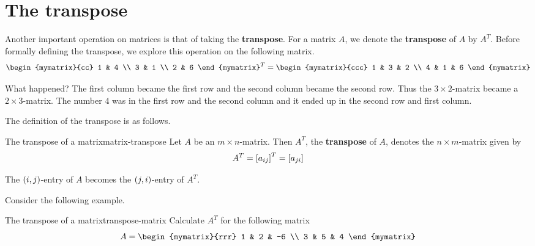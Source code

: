 \section{The transpose}

Another important operation on matrices is that of taking the
\textbf{transpose}. For a matrix $A$, we denote the \textbf{transpose}
of $A$ by $A^T$. Before formally defining the transpose, we explore
this operation on the following matrix.
\begin{equation*}
  \begin{mymatrix}{cc}
    1 & 4 \\
    3 & 1 \\
    2 & 6
  \end{mymatrix} ^{T}=\allowbreak \begin{mymatrix}{ccc}
    1 & 3 & 2 \\
    4 & 1 & 6
  \end{mymatrix}
\end{equation*}

What happened? The first column became the first row and the second
column became the second row. Thus the $3\times 2$-matrix became a
$2\times 3$-matrix. The number $4$ was in the first row and the second
column and it ended up in the second row and first column.

The definition of the transpose is as follows.

\begin{definition}{The transpose of a matrix}{matrix-transpose}
  Let $A$ be an $m\times n$-matrix. Then $A^{T}$, the
  \textbf{transpose} of $A$,
  denotes the $n\times m$-matrix given by
  \begin{equation*}
    A^{T} = \left[a _{ij}\right] ^{T}= \left[a_{ji} \right]
  \end{equation*}
\end{definition}

The $\left(i, j \right)$-entry of $A$ becomes the $\left(j,i \right)$-entry of
$A^T$.

Consider the following example.

\begin{example}{The transpose of a matrix}{transpose-matrix}
  Calculate $A^T$ for the following matrix
  \begin{equation*}
    A = \begin{mymatrix}{rrr}
      1 & 2 & -6 \\
      3 & 5 & 4
    \end{mymatrix}
  \end{equation*}
\end{example}

